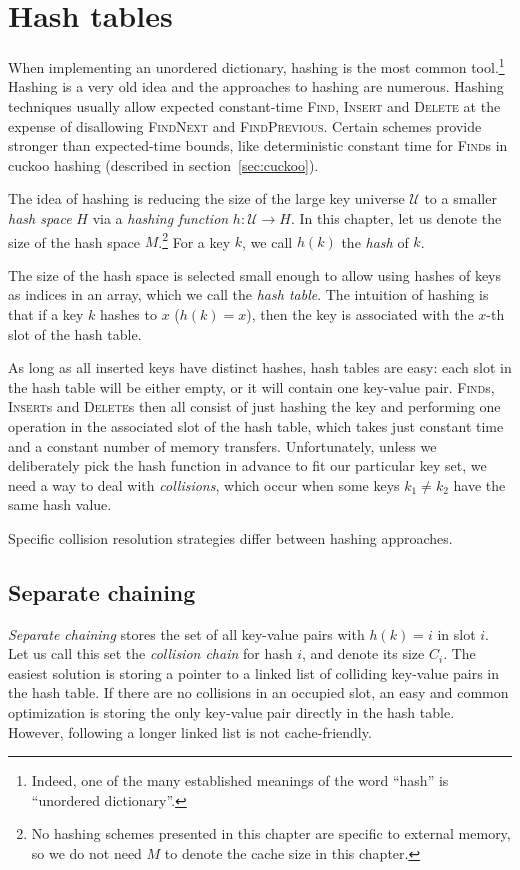 \chapter{Hash tables}
\label{chapter:hashing}
When implementing an unordered dictionary, hashing is the most common
tool.\footnote{%
	Indeed, one of the many established meanings of the word ``hash''
	is ``unordered dictionary''.}
Hashing is a very old idea and the approaches to hashing are numerous. Hashing
techniques usually allow expected constant-time \textsc{Find}, \textsc{Insert}
and \textsc{Delete} at the expense of disallowing \textsc{FindNext} and
\textsc{FindPrevious}. Certain schemes provide stronger than expected-time
bounds, like deterministic constant time for \textsc{Find}s in cuckoo hashing
(described in section~\ref{sec:cuckoo}).

The idea of hashing is reducing the size of the large key universe
$\mathcal{U}$ to a smaller \emph{hash space} $H$ via a \emph{hashing function}
$h\mathop{:}\mathcal{U}\rightarrow H$.
In this chapter, let us denote the size of the hash space $M$.\footnote{%
	No hashing schemes presented in this chapter are specific to external
	memory, so we do not need $M$ to denote the cache size in this chapter.
}
For a key $k$, we call $h(k)$ the \emph{hash} of $k$.

The size of the hash space is selected small enough to allow using hashes
of keys as indices in an array, which we call the \emph{hash table}.
The intuition of hashing is that if a key $k$ hashes to $x$ ($h(k)=x$), then
the key is associated with the $x$-th slot of the hash table.

As long as all inserted keys have distinct hashes, hash tables are easy:
each slot in the hash table will be either empty, or it will contain one
key-value pair. \textsc{Find}s, \textsc{Insert}s and \textsc{Delete}s then
all consist of just hashing the key and performing one operation in the
associated slot of the hash table, which takes just constant time and
a constant number of memory transfers.
Unfortunately, unless we deliberately pick the hash function in advance to fit
our particular key set, we need a way to deal with \emph{collisions},
which occur when some keys $k_1\neq k_2$ have the same hash value.

Specific collision resolution strategies differ between hashing approaches.

\section{Separate chaining}
\emph{Separate chaining} stores the set of all key-value pairs with
$h(k)=i$ in slot $i$. Let us call this set the \emph{collision chain} for hash
$i$, and denote its size $C_i$. The easiest solution is storing a pointer to
a linked list of colliding key-value pairs in the hash table. If there are no
collisions in an occupied slot, an easy and common optimization is storing
the only key-value pair directly in the hash table. However, following a longer
linked list is not cache-friendly.

